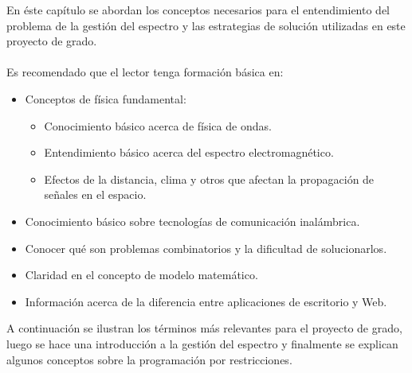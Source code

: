 En éste capítulo se abordan los conceptos necesarios para el entendimiento del problema de la gestión del espectro y las estrategias de solución utilizadas en este proyecto de grado.
\\\\
Es recomendado que el lector tenga formación básica en:

\begin{itemize}
	\item {Conceptos de física fundamental:
		\begin{itemize}
			\item Conocimiento básico acerca de física de ondas.
			\item Entendimiento básico acerca del espectro electromagnético.
			\item Efectos de la distancia, clima y otros que afectan la propagación de señales en el espacio.
		\end{itemize}
	}
	\item Conocimiento básico sobre tecnologías de comunicación inalámbrica.
	\item Conocer qué son problemas combinatorios y la dificultad de solucionarlos.
	\item Claridad en el concepto de modelo matemático.
	\item Información acerca de la diferencia entre aplicaciones de escritorio y Web.
\end{itemize}

A continuación se ilustran los términos más relevantes para el proyecto de grado, luego se hace una introducción a la gestión del espectro y finalmente se explican algunos conceptos sobre la programación por restricciones.
